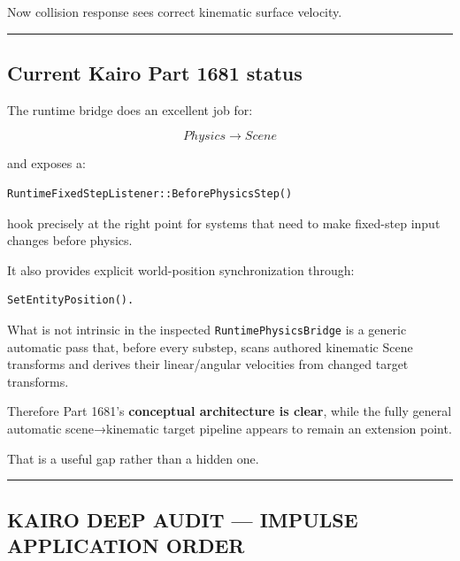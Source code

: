Now collision response sees correct kinematic surface velocity.

\begin{center}\rule{0.5\linewidth}{0.5pt}\end{center}

\subsection{Current Kairo Part 1681 status}\label{06-engine-ii-ch037-current-kairo-part-1681-status}

\hypertarget{06-engine-ii-ch037-current-kairo-part-1681-status}{}

The runtime bridge does an excellent job for:

\[
Physics\rightarrow Scene
\]

and exposes a:

\begin{verbatim}
RuntimeFixedStepListener::BeforePhysicsStep()
\end{verbatim}

hook precisely at the right point for systems that need to make fixed-step input changes before physics.

It also provides explicit world-position synchronization through:

\begin{verbatim}
SetEntityPosition().
\end{verbatim}

What is not intrinsic in the inspected \texttt{RuntimePhysicsBridge} is a generic automatic pass that, before every substep, scans authored kinematic Scene transforms and derives their linear/angular velocities from changed target transforms.

Therefore Part 1681's \textbf{conceptual architecture is clear}, while the fully general automatic scene→kinematic target pipeline appears to remain an extension point.

That is a useful gap rather than a hidden one.

\begin{center}\rule{0.5\linewidth}{0.5pt}\end{center}

\subsection{KAIRO DEEP AUDIT --- IMPULSE APPLICATION ORDER}\label{06-engine-ii-ch037-kairo-deep-audit-impulse-application-order}

